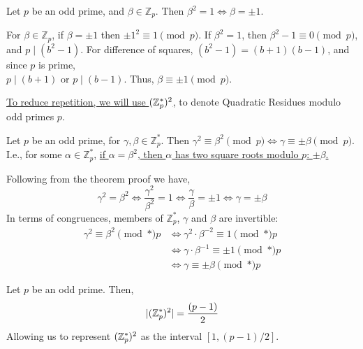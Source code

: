 \begin{theo}

    \label{theo:square_roots_1}

    Let $p$ be an odd prime, and $\beta\in\mathbb{Z}_p$. Then $\beta^2=1\Longleftrightarrow \beta=\pm1$.
\end{theo}
\begin{Proof}
    For $\beta\in\mathbb{Z}_p$, if $\beta=\pm1$ then $\pm1^2\equiv 1\pmod{p}$. If $\beta^2=1$, then $\beta^2-1\equiv 0\pmod{p}$,
    and $p\mid(b^2-1)$. For difference of squares, $(b^2-1)=(b+1)(b-1)$, and since $p$ is prime,\\
    $p\mid(b+1)$ or $p\mid(b-1)$. Thus, $\beta\equiv \pm1\pmod{p}$.
\end{Proof}

\newpage

\noindent
\underline{To reduce repetition, we will use $(\mathbb{Z}_p^*)^2$,} to denote Quadratic Residues modulo odd primes $p$.
\begin{theo}
    
        Let $p$ be an odd prime, for $\gamma,\beta\in\mathbb{Z}_p^*$. Then $\gamma^2\equiv\beta^2\pmod{p}\Longleftrightarrow\gamma\equiv\pm\beta\pmod{p}$.\\
        I.e., for some $\alpha\in\mathbb{Z}_p^*$, \underline{if $\alpha=\beta^2$, then $\alpha$ has two square roots modulo $p$: $\pm\beta$.}
\end{theo}
\begin{Proof}
Following from the theorem proof we have,
\[\gamma^2 = \beta^2 \iff \frac{\gamma^2}{\beta^2} = 1 \iff \frac{\gamma}{\beta} = \pm 1 \iff \gamma = \pm \beta\]  
In terms of congruences, members of $\mathbb{Z}_p^*$, $\gamma$ and $\beta$ are invertible:
\begin{align*} 
\gamma^2 \equiv \beta^2 \pmod*{p} &\iff \gamma^2\cdot\beta^{-2} \equiv 1 \pmod*{p}\\
&\iff \gamma\cdot\beta^{-1} \equiv \pm 1 \pmod*{p}\\
&\iff \gamma \equiv \pm \beta \pmod*{p}
\end{align*}

\noindent

\end{Proof}

\begin{theo}
    
    Let $p$ be an odd prime. Then,
     \Large\[|(\mathbb{Z}_p^*)^2|=\frac{(p-1)}{2}
     \]
     \normalsize
     \noindent
     Allowing us to represent $(\mathbb{Z}_p^*)^2$ as the interval $[1,(p-1)/2]$.
\end{theo}

